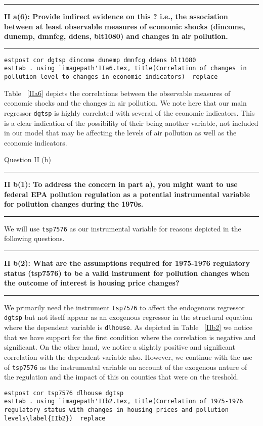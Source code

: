 \documentclass[12pt]{article}
\newcommand\question[2]{\vspace{1em}\hrule\vspace{1em}\textbf{#1: #2}\vspace{1em}\hrule\vspace{1em}}
\begin{document}
\question{II a(6)}{Provide indirect evidence on this ? i.e., the association between at least observable measures of economic shocks (dincome, dunemp, dmnfcg, ddens, blt1080) and changes in air pollution.  }
\begin{lstlisting}
estpost cor dgtsp dincome dunemp dmnfcg ddens blt1080
esttab . using `imagepath'IIa6.tex, title(Correlation of changes in pollution level to changes in economic indicators)  replace
\end{lstlisting}

Table ~\ref{IIa6} depicts the correlations between the observable measures of economic shocks and the changes in air pollution. We note here that our main regressor \verb|dgtsp| is highly correlated with several of the economic indicators. This is a clear indication of the possibility of their being another variable, not included in our model that may be affecting the levels of air pollution as well as the economic indicators.

\begin{center}\LARGE{Question II (b)}\end{center}
\question{II b(1)}{To address the concern in part a), you might want to use federal EPA pollution regulation as a potential instrumental variable for pollution changes during the 1970s.}
We will use \verb|tsp7576| as our instrumental variable for reasons depicted in the following questions.

\question{II b(2)}{What are the assumptions required for 1975-1976 regulatory status (tsp7576) to be a valid instrument for pollution changes when the outcome of interest is housing price changes? }
We primarily need the instrument \verb|tsp7576| to affect the endogenous regressor \verb|dgtsp| but not itself appear as an exogenous regressor in the structural equation where the dependent variable is \verb|dlhouse|. As depicted in Table ~\ref{IIb2} we notice that we have support for the first condition where the correlation is negative and significant. On the other hand, we notice a slightly positive and significant correlation with the dependent variable also. However, we continue with the use of \verb|tsp7576| as the instrumental variable on account of the exogenous nature of the regulation and the impact of this on counties that were on the treshold.
\begin{lstlisting}
estpost cor tsp7576 dlhouse dgtsp
esttab . using `imagepath'IIb2.tex, title(Correlation of 1975-1976 regulatory status with changes in housing prices and pollution levels\label{IIb2})  replace
\end{lstlisting}

\end{document}
